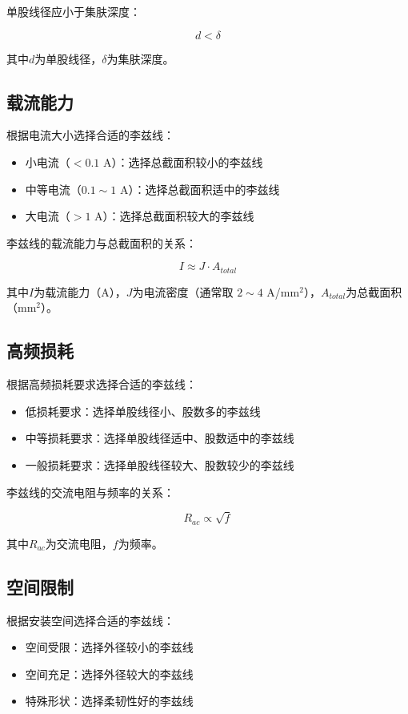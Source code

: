 \documentclass[12pt,UTF8]{ctexbook}
\begin{document}
单股线径应小于集肤深度：

$$ d < \delta $$

其中$d$为单股线径，$\delta$为集肤深度。

\subsection{载流能力}

根据电流大小选择合适的李兹线：

\begin{itemize}[leftmargin=2cm]
    \item 小电流（$< 0.1$ A）：选择总截面积较小的李兹线
    \item 中等电流（$0.1 \sim 1$ A）：选择总截面积适中的李兹线
    \item 大电流（$> 1$ A）：选择总截面积较大的李兹线
\end{itemize}

李兹线的载流能力与总截面积的关系：

$$ I \approx J \cdot A_{total} $$

其中$I$为载流能力（A），$J$为电流密度（通常取 $2 \sim 4$ A/mm$^2$），$A_{total}$为总截面积（mm$^2$）。

\subsection{高频损耗}

根据高频损耗要求选择合适的李兹线：

\begin{itemize}[leftmargin=2cm]
    \item 低损耗要求：选择单股线径小、股数多的李兹线
    \item 中等损耗要求：选择单股线径适中、股数适中的李兹线
    \item 一般损耗要求：选择单股线径较大、股数较少的李兹线
\end{itemize}

李兹线的交流电阻与频率的关系：

$$ R_{ac} \propto \sqrt{f} $$

其中$R_{ac}$为交流电阻，$f$为频率。

\subsection{空间限制}

根据安装空间选择合适的李兹线：

\begin{itemize}[leftmargin=2cm]
    \item 空间受限：选择外径较小的李兹线
    \item 空间充足：选择外径较大的李兹线
    \item 特殊形状：选择柔韧性好的李兹线
\end{itemize}
\end{document}
